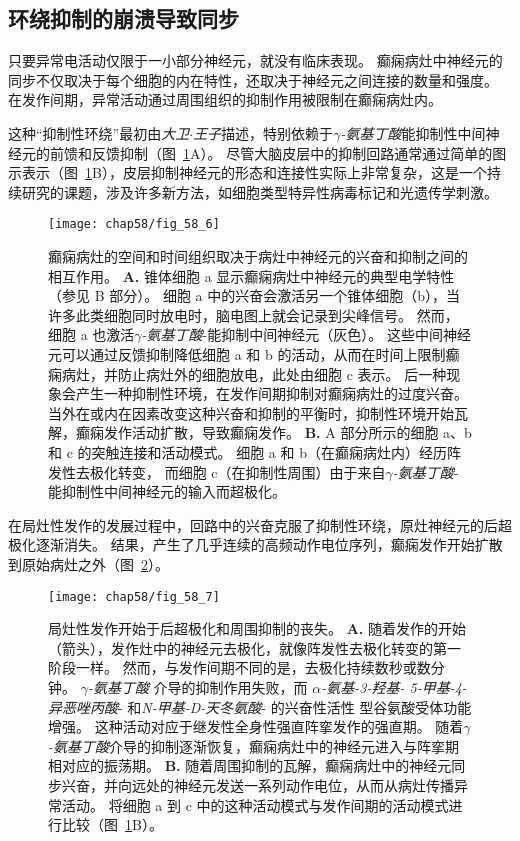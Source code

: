 \subsection{环绕抑制的崩溃导致同步}

只要异常电活动仅限于一小部分神经元，就没有临床表现。
癫痫病灶中神经元的同步不仅取决于每个细胞的内在特性，还取决于神经元之间连接的数量和强度。
在发作间期，异常活动通过周围组织的抑制作用被限制在癫痫病灶内。


这种“抑制性环绕”最初由\textit{大卫$\cdot$王子}描述，特别依赖于\textit{$\gamma$-氨基丁酸}能抑制性中间神经元的前馈和反馈抑制（图~\ref{fig:58_6}A）。
尽管大脑皮层中的抑制回路通常通过简单的图示表示（图~\ref{fig:58_6}B），皮层抑制神经元的形态和连接性实际上非常复杂，这是一个持续研究的课题，涉及许多新方法，如细胞类型特异性病毒标记和光遗传学刺激。


\begin{figure}[htbp]
	\centering
	\texttt{[image: chap58/fig\_58\_6]}
	\caption{癫痫病灶的空间和时间组织取决于病灶中神经元的兴奋和抑制之间的相互作用。
		\textbf{A.} 锥体细胞 a 显示癫痫病灶中神经元的典型电学特性（参见 B 部分）。
		细胞 a 中的兴奋会激活另一个锥体细胞（b），当许多此类细胞同时放电时，脑电图上就会记录到尖峰信号。
		然而，细胞 a 也激活\textit{$\gamma$-氨基丁酸}-能抑制中间神经元（灰色）。
		这些中间神经元可以通过反馈抑制降低细胞 a 和 b 的活动，从而在时间上限制癫痫病灶，并防止病灶外的细胞放电，此处由细胞 c 表示。
		后一种现象会产生一种抑制性环境，在发作间期抑制对癫痫病灶的过度兴奋。
		当外在或内在因素改变这种兴奋和抑制的平衡时，抑制性环境开始瓦解，癫痫发作活动扩散，导致癫痫发作\cite{lothman1990seizures}。
		\textbf{B.} A 部分所示的细胞 a、b 和 c 的突触连接和活动模式。
		细胞 a 和 b（在癫痫病灶内）经历阵发性去极化转变， 而细胞 c（在抑制性周围）由于来自\textit{$\gamma$-氨基丁酸}-能抑制性中间神经元的输入而超极化。}
	\label{fig:58_6}
\end{figure}


在局灶性发作的发展过程中，回路中的兴奋克服了抑制性环绕，原灶神经元的后超极化逐渐消失。
结果，产生了几乎连续的高频动作电位序列，癫痫发作开始扩散到原始病灶之外（图~\ref{fig:58_7}）。


\begin{figure}[htbp]
	\centering
	\texttt{[image: chap58/fig\_58\_7]}
	\caption{局灶性发作开始于后超极化和周围抑制的丧失\cite{lothman1993neurobiology}。
		\textbf{A.} 随着发作的开始（箭头），发作灶中的神经元去极化，就像阵发性去极化转变的第一阶段一样。
		然而，与发作间期不同的是，去极化持续数秒或数分钟。
		\textit{$\gamma$-氨基丁酸} 介导的抑制作用失败，而 \textit{$\alpha$-氨基-3-羟基- 5-甲基-4-异恶唑丙酸}- 和\textit{N-甲基-D-天冬氨酸}- 的兴奋性活性 型谷氨酸受体功能增强。
		这种活动对应于继发性全身性强直阵挛发作的强直期。
		随着\textit{$\gamma$-氨基丁酸}介导的抑制逐渐恢复，癫痫病灶中的神经元进入与阵挛期相对应的振荡期。
		\textbf{B.} 随着周围抑制的瓦解，癫痫病灶中的神经元同步兴奋，并向远处的神经元发送一系列动作电位，从而从病灶传播异常活动。
		将细胞 a 到 c 中的这种活动模式与发作间期的活动模式进行比较（图~\ref{fig:58_6}B）。}
	\label{fig:58_7}
\end{figure}


